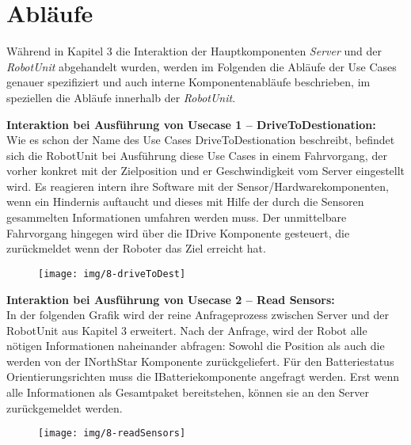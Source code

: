 \section{Abläufe}

Während in Kapitel 3 die Interaktion der Hauptkomponenten \emph{Server} und der \emph{RobotUnit} abgehandelt wurden, werden im Folgenden die Abläufe der Use Cases genauer spezifiziert und auch interne Komponentenabläufe beschrieben, im speziellen die Abläufe innerhalb der \emph{RobotUnit}.
	
	\textbf{Interaktion bei Ausführung von Usecase 1 – DriveToDestionation:}\\
	Wie es schon der Name des Use Cases DriveToDestionation beschreibt, befindet sich die RobotUnit bei Ausführung diese Use Cases in einem Fahrvorgang, der vorher konkret mit der Zielposition und er Geschwindigkeit vom Server eingestellt wird. Es reagieren intern ihre Software mit der Sensor/Hardwarekomponenten, wenn ein Hindernis auftaucht und dieses mit Hilfe der durch die Sensoren gesammelten Informationen umfahren werden muss. Der unmittelbare Fahrvorgang hingegen wird über die IDrive Komponente gesteuert, die zurückmeldet wenn der Roboter das Ziel erreicht hat.
	\begin{figure}[H]
		\centering
		\texttt{[image: img/8-driveToDest]}
		\label{DriveToDestionation}
	\end{figure}
	
	
	\textbf{Interaktion bei Ausführung von Usecase 2 – Read Sensors:}\\
	In der folgenden Grafik wird der reine Anfrageprozess zwischen Server und der RobotUnit aus Kapitel 3 erweitert. Nach der Anfrage, wird der Robot alle nötigen Informationen naheinander abfragen: Sowohl die Position als auch die werden von der INorthStar Komponente zurückgeliefert. Für den Batteriestatus Orientierungsrichten muss die IBatteriekomponente angefragt werden. Erst wenn alle Informationen als Gesamtpaket bereitstehen, können sie an den Server zurückgemeldet werden.\\
	\begin{figure}[H]
		\centering
		\texttt{[image: img/8-readSensors]}
		\label{Read Sensors}
	\end{figure}
	
